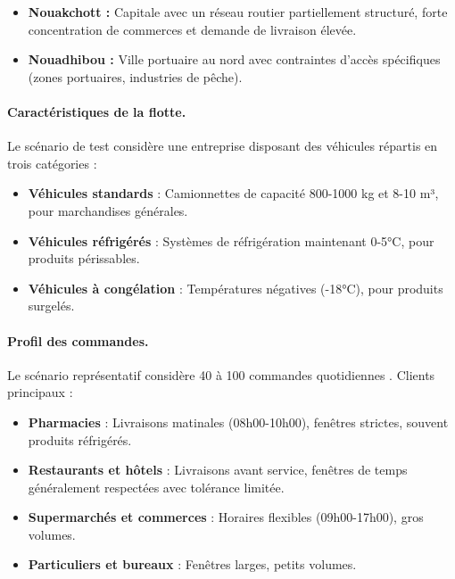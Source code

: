 \documentclass[12pt,a4paper]{report}
\begin{document}
\begin{itemize}[leftmargin=2.2em]
    \item \textbf{Nouakchott :} Capitale avec un réseau routier partiellement structuré, forte concentration de commerces et demande de livraison élevée.

    \item \textbf{Nouadhibou :} Ville portuaire au nord avec contraintes d'accès spécifiques (zones portuaires, industries de pêche).

\end{itemize}

\paragraph{Caractéristiques de la flotte.} Le scénario de test considère une entreprise disposant des véhicules répartis en trois catégories :

\begin{itemize}[leftmargin=2.2em]
    \item \textbf{Véhicules standards} : Camionnettes de capacité 800-1000 kg et 8-10 m³, pour marchandises générales.

    \item \textbf{Véhicules réfrigérés} : Systèmes de réfrigération maintenant 0-5°C, pour produits périssables.

    \item \textbf{Véhicules à congélation} : Températures négatives (-18°C), pour produits surgelés.
\end{itemize}

\paragraph{Profil des commandes.} Le scénario représentatif considère 40 à 100 commandes quotidiennes . Clients principaux :

\begin{itemize}[leftmargin=2.2em]
    \item \textbf{Pharmacies} : Livraisons matinales (08h00-10h00), fenêtres strictes, souvent produits réfrigérés.

    \item \textbf{Restaurants et hôtels} : Livraisons avant service, fenêtres de temps généralement respectées avec tolérance limitée.

    \item \textbf{Supermarchés et commerces} : Horaires flexibles (09h00-17h00), gros volumes.

    \item \textbf{Particuliers et bureaux} : Fenêtres larges, petits volumes.
\end{itemize}
\end{document}

